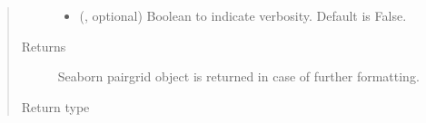 \documentclass[letterpaper,10pt,english]{sphinxmanual}
\begin{document}
\begin{fulllineitems}
\begin{quote}
\begin{description}
\begin{itemize}
\item {} 
 (, optional) \textendash{} Boolean to indicate verbosity. Default is False.

\end{itemize}

\item[{Returns}] \leavevmode
{} \textendash{} Seaborn pairgrid object is returned in case of further formatting.

\item[{Return type}] \leavevmode
{}

\end{description}\end{quote}

\end{fulllineitems}

\end{document}
